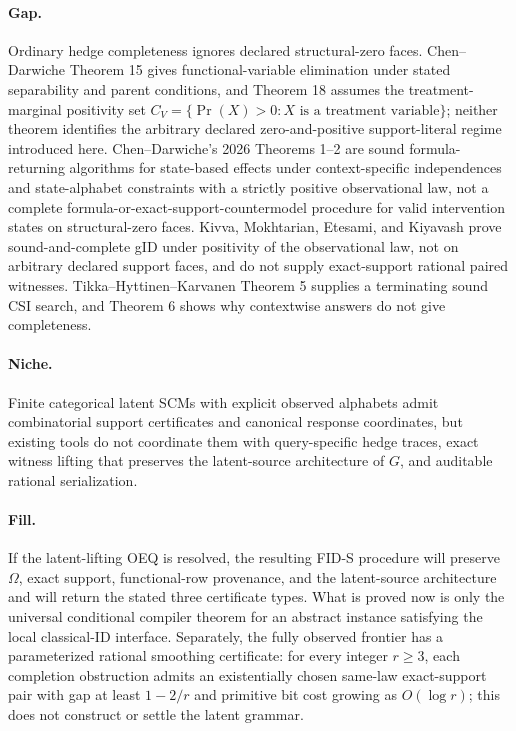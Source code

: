 \documentclass{article}
\begin{document}
\paragraph{Gap.} Ordinary hedge completeness ignores declared structural-zero faces. Chen--Darwiche Theorem 15 gives functional-variable elimination under stated separability and parent conditions, and Theorem 18 assumes the treatment-marginal positivity set \(C_V=\{\Pr(X)>0:X\text{ is a treatment variable}\}\); neither theorem identifies the arbitrary declared zero-and-positive support-literal regime introduced here. Chen--Darwiche's 2026 Theorems 1--2 are sound formula-returning algorithms for state-based effects under context-specific independences and state-alphabet constraints with a strictly positive observational law, not a complete formula-or-exact-support-countermodel procedure for valid intervention states on structural-zero faces. Kivva, Mokhtarian, Etesami, and Kiyavash prove sound-and-complete gID under positivity of the observational law, not on arbitrary declared support faces, and do not supply exact-support rational paired witnesses. Tikka--Hyttinen--Karvanen Theorem 5 supplies a terminating sound CSI search, and Theorem 6 shows why contextwise answers do not give completeness.

\paragraph{Niche.} Finite categorical latent SCMs with explicit observed alphabets admit combinatorial support certificates and canonical response coordinates, but existing tools do not coordinate them with query-specific hedge traces, exact witness lifting that preserves the latent-source architecture of \(G\), and auditable rational serialization.

\paragraph{Fill.} If the latent-lifting OEQ is resolved, the resulting FID-S procedure will preserve \(\Omega\), exact support, functional-row provenance, and the latent-source architecture and will return the stated three certificate types. What is proved now is only the universal conditional compiler theorem for an abstract instance satisfying the local classical-ID interface. Separately, the fully observed frontier has a parameterized rational smoothing certificate: for every integer \(r\geq3\), each completion obstruction admits an existentially chosen same-law exact-support pair with gap at least \(1-2/r\) and primitive bit cost growing as \(O(\log r)\); this does not construct or settle the latent grammar.
\end{document}

